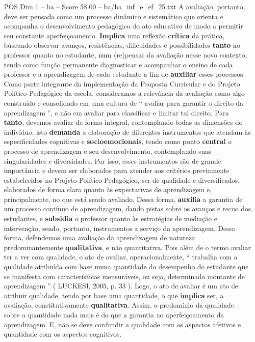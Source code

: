 \begin{textsample}{POS Dim 1 – ba – Score 58.00 – ba/ba\_inf\_e\_ef\_25.txt}
A avaliação, portanto, deve ser pensada como um processo dinâmico e sistemático que orienta e acompanha o desenvolvimento pedagógico do ato educativo de modo a permitir seu constante aperfeiçoamento. \textbf{Implica} uma reflexão \textbf{crítica} da prática, buscando observar avanços, resistências, dificuldades e possibilidades \textbf{tanto} no professor quanto no estudante, num (re)pensar da avaliação nesse novo contexto, tendo como função permanente diagnosticar e acompanhar o ensino de cada professor e a aprendizagem de cada estudante a fim de \textbf{auxiliar} esses processos.
Como parte integrante da implementação da Proposta Curricular e do Projeto Político-Pedagógico da escola, consideramos a relevância da avaliação como algo construído e consolidado em uma cultura de “ avaliar para garantir o direito da aprendizagem ”, e não em avaliar para classificar e limitar tal direito.
Para \textbf{tanto}, devemos avaliar de forma integral, contemplando todas as dimensões do indivíduo, isto \textbf{demanda} a elaboração de diferentes instrumentos que atendam às especificidades cognitivas e \textbf{socioemocionais}, tendo como ponto \textbf{central} o processo de aprendizagem e seu desenvolvimento, contemplando suas singularidades e diversidades.
Por isso, esses instrumentos são de grande importância e devem ser elaborados para atender aos critérios previamente estabelecidos no Projeto Político-Pedagógico, ser de qualidade e diversificados, elaborados de forma clara quanto às expectativas de aprendizagem e, principalmente, no que está sendo avaliado.
Dessa forma, \textbf{auxilia} a garantia de um processo contínuo de aprendizagem, dando pistas sobre os avanços e recuo dos estudantes, e \textbf{subsidia} o professor quanto às estratégias de mediação e intervenção, sendo, portanto, instrumentos a serviço da aprendizagem.
Dessa forma, defendemos uma avaliação da aprendizagem de natureza predominantemente \textbf{qualitativa}, e não quantitativa.
Pois além de o termo avaliar ter a ver com qualidade, o ato de avaliar, operacionalmente, “ trabalha com a qualidade atribuída com base numa quantidade do desempenho do estudante que se manifesta com características mensuráveis, ou seja, determinado montante de aprendizagem ” ( LUCKESI, 2005, p. 33 ).
Logo, o ato de avaliar é um ato de atribuir qualidade, tendo por base uma quantidade, o que \textbf{implica} ser, a avaliação, constitutivamente \textbf{qualitativa}.
Assim, o predomínio da qualidade sobre a quantidade nada mais é do que a garantia no aperfeiçoamento da aprendizagem.
E, não se deve confundir a qualidade com os aspectos afetivos e quantidade com os aspectos cognitivos.

\end{textsample}
